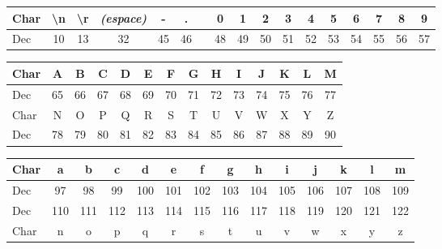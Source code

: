 \documentclass[11pt,a4paper]{article}
\begin{document}
\begin{center}
\begin{tabular}{ | l |c|c|c|c|c| c |c|c|c|c|c|c|c|c|c|c| }
\hline
Char & \textbackslash{}n & \textbackslash{}r & \textit{(espace)} &  - &  . &   & 0 &  1 &  2 &  3 &  4 &  5 &  6 &  7 &  8 &  9 \\
\hline
Dec &         10         &        13         &         32        & 45 & 46 &   & 48 & 49 & 50 & 51 & 52 & 53 & 54 & 55 & 56 & 57 \\
\hline
\end{tabular}

\medskip


\begin{tabular}{ | l |c|c|c|c|c|c|c|c|c|c|c|c|c| }
\hline
Char &  A &  B &  C &  D &  E &  F &  G &  H &  I &  J &  K &  L &  M \\
\hline
Dec &  65 & 66 & 67 & 68 & 69 & 70 & 71 & 72 & 73 & 74 & 75 & 76 & 77 \\
\hline
%
%
\hline
Char &  N &  O &  P &  Q &  R &  S &  T &  U &  V &  W &  X &  Y &  Z \\
\hline
Dec &  78 & 79 & 80 & 81 & 82 & 83 & 84 & 85 & 86 & 87 & 88 & 89 & 90 \\
\hline
\end{tabular}


\medskip

\begin{tabular}{ | l |c|c|c|c|c|c|c|c|c|c|c|c|c| }
\hline
Char &  a &  b &  c &  d  &  e  &  f  &  g  &  h  &  i  &  j  &  k  &  l  &  m \\
\hline
Dec &  97 & 98 & 99 & 100 & 101 & 102 & 103 & 104 & 105 & 106 & 107 & 108 & 109 \\
\hline
%
%
\hline
Dec &  110 & 111 & 112 & 113 & 114 & 115 & 116 & 117 & 118 & 119 & 120 & 121 & 122 \\
\hline
Char &  n  &  o  &  p  &  q  &  r  &  s  &  t  &  u  &  v  &  w  &  x  &  y  &  z \\
\hline
\end{tabular}

\end{center}
\end{document}
